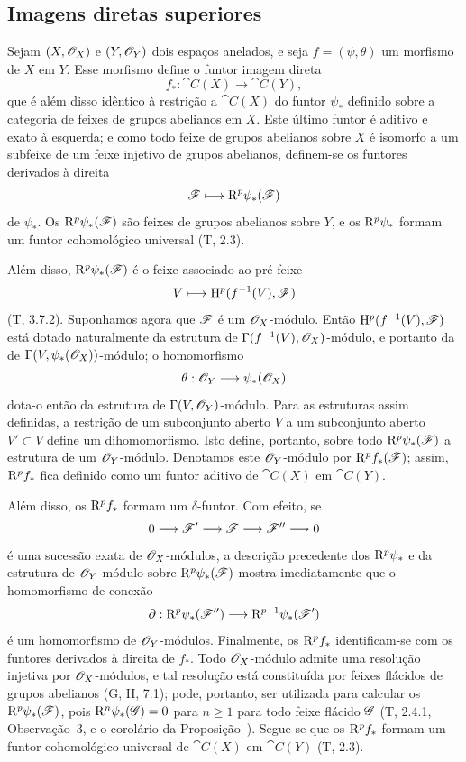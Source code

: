 \subsection{Imagens diretas superiores}
\label{subsection:0.12.2}

\begin{env}[12.2.1]
\label{0.12.2.1}
Sejam $(X,\mathscr{O}_X)$ e $(Y,\mathscr{O}_Y)$ dois espaços anelados, e seja
$f=(\psi,\theta)$ um morfismo de $X$ em $Y$.  Esse morfismo define o funtor imagem
direta
\[
  f_*:\cat{C}(X)\longrightarrow\cat{C}(Y),
\]
que é além disso idêntico à restrição a $\cat{C}(X)$ do
funtor $\psi_*$ definido sobre a categoria de feixes de grupos abelianos
em $X$.
Este último funtor é aditivo e exato à esquerda; e como todo feixe de
grupos abelianos sobre $X$ é isomorfo a um subfeixe de um feixe injetivo
de grupos abelianos, definem-se os funtores derivados à direita
\[
  \mathscr{F}\longmapsto\mathrm{R}^p\psi_*(\mathscr{F})
\]
de $\psi_*$.  Os $\mathrm{R}^p\psi_*(\mathscr{F})$ são feixes de grupos abelianos
sobre $Y$, e os $\mathrm{R}^p\psi_*$ formam um funtor cohomológico universal
(T, 2.3).

Além disso, $\mathrm{R}^p\psi_*(\mathscr{F})$ é o feixe associado ao
pré-feixe
\[
  V\longmapsto\mathrm{H}^p(f^{-1}(V),\mathscr{F})
\]
(T, 3.7.2).
Suponhamos agora que $\mathscr{F}$ é um $\mathscr{O}_X$-módulo.
Então $\mathrm{H}^p(f^{-1}(V),\mathscr{F})$ está dotado naturalmente da estrutura
de $\Gamma(f^{-1}(V),\mathscr{O}_X)$-módulo, e portanto da de
$\Gamma(V,\psi_*(\mathscr{O}_X))$-módulo; o homomorfismo
\[
  \theta:\mathscr{O}_Y\longrightarrow\psi_*(\mathscr{O}_X)
\]
dota-o então da estrutura de
$\Gamma(V,\mathscr{O}_Y)$-módulo.
Para as estruturas assim definidas, a restrição de um subconjunto aberto
$V$ a um subconjunto aberto $V'\subset V$ define um dihomomorfismo.  Isto
define, portanto, sobre todo $\mathrm{R}^p\psi_*(\mathscr{F})$ a estrutura de um
$\mathscr{O}_Y$-módulo.  Denotamos este $\mathscr{O}_Y$-módulo por
$\mathrm{R}^p f_*(\mathscr{F})$; assim, $\mathrm{R}^p f_*$ fica definido como um funtor
aditivo de $\cat{C}(X)$ em $\cat{C}(Y)$.

Além disso, os $\mathrm{R}^p f_*$ formam um $\delta$-funtor.  Com efeito, se
\[
  0\longrightarrow\mathscr{F}'\longrightarrow\mathscr{F}
  \longrightarrow\mathscr{F}''\longrightarrow0
\]
é uma sucessão exata de $\mathscr{O}_X$-módulos, a descrição precedente
dos $\mathrm{R}^p\psi_*$ e da estrutura de $\mathscr{O}_Y$-módulo sobre
$\mathrm{R}^p\psi_*(\mathscr{F})$ mostra imediatamente que o homomorfismo de conexão
\[
  \partial:\mathrm{R}^p\psi_*(\mathscr{F}'')
  \longrightarrow\mathrm{R}^{p+1}\psi_*(\mathscr{F}')
\]
é um homomorfismo de $\mathscr{O}_Y$-módulos.
Finalmente, os $\mathrm{R}^p f_*$ identificam-se com os funtores derivados à
direita de $f_*$.  Todo $\mathscr{O}_X$-módulo admite uma resolução injetiva por
$\mathscr{O}_X$-módulos, e tal resolução está constituída por feixes flácidos
de grupos abelianos (G, II, 7.1); pode, portanto, ser utilizada para calcular
os $\mathrm{R}^p\psi_*(\mathscr{F})$, pois $\mathrm{R}^n\psi_*(\mathscr{G})=0$ para $n\geq1$
para todo feixe flácido $\mathscr{G}$ (T, 2.4.1, Observação~3, e o
 corolário da Proposição~).
Segue-se que os $\mathrm{R}^p f_*$ formam um funtor cohomológico universal
de $\cat{C}(X)$ em $\cat{C}(Y)$ (T, 2.3).
\end{env}

